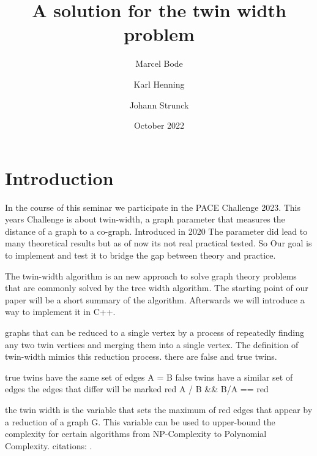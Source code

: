 \documentclass[acmsmall,review]{acmart}
\date{October 2022}
\title{A solution for the twin width problem}
\author{Marcel Bode}
\author{Karl Henning}
\author{Johann Strunck}
\begin{document}
\maketitle

\section{Introduction}

In the course of this seminar we participate in the PACE Challenge 2023. This years Challenge is about twin-width, a graph parameter that measures the distance of a graph to a co-graph. Introduced in 2020 The parameter did lead to many theoretical results but as of now its not real practical tested. So Our goal is to implement and test it to bridge the gap between theory and practice. %

The twin-width algorithm is an new approach to solve graph theory problems that are commonly solved by the tree width algorithm. The starting point of our paper will be a short summary of the algorithm. Afterwards we will introduce a way to implement it in C++.

graphs that can be reduced to a single vertex by a process of repeatedly finding any two twin vertices and merging them into a single vertex. The definition of twin-width mimics this reduction process.
there are false and true twins.

true twins have the same set of edges A = B
 false twins have a similar set of edges the edges that differ will be marked red  {A / B  && B/A} == red

 the twin width is the variable that sets the maximum of red edges that appear by a reduction of a graph G. This variable can be used to upper-bound the complexity for certain algorithms from NP-Complexity to Polynomial Complexity.
 citations: \cite{bonnet2021twini} \cite{bonnet2021twinii}.



\end{document}
